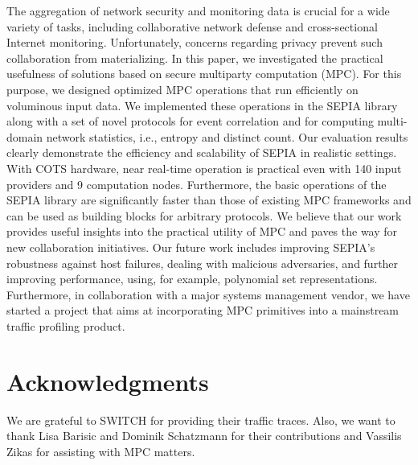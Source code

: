 \documentclass[letterpaper,11pt,onecolumn,titlepage]{article}
\begin{document}
The aggregation of network security and monitoring data is crucial for
a wide variety of tasks, including collaborative network defense and
cross-sectional Internet monitoring. Unfortunately, concerns regarding
privacy prevent such collaboration from materializing. In this paper,
we investigated the practical usefulness of solutions based on secure
multiparty computation (MPC).  For this purpose, we designed optimized
MPC operations that run efficiently on voluminous input data.  We
implemented these operations in the SEPIA library along with a set of
novel protocols for event correlation and for computing multi-domain
network statistics, i.e., entropy and distinct count.  Our evaluation
results clearly demonstrate the efficiency and scalability of SEPIA in
realistic settings. With COTS hardware, near real-time operation is
practical even with 140 input providers and 9 computation
nodes. Furthermore, the basic operations of the SEPIA library are
significantly faster than those of existing MPC frameworks and can be
used as building blocks for arbitrary protocols.  We believe that our
work provides useful insights into the practical utility of MPC and
paves the way for new collaboration initiatives. Our future work
includes improving SEPIA's robustness against host failures, dealing
with malicious adversaries, and further improving performance, using,
for example, polynomial set representations.  Furthermore, in
collaboration with a major systems management vendor, we have started
a project that aims at incorporating MPC primitives into a mainstream
traffic profiling product.


\section*{Acknowledgments}

We are grateful to SWITCH for providing their traffic traces.  Also,
we want to thank Lisa Barisic and Dominik Schatzmann for their
contributions and Vassilis Zikas for assisting with MPC matters.



\footnotesize

\end{document}
